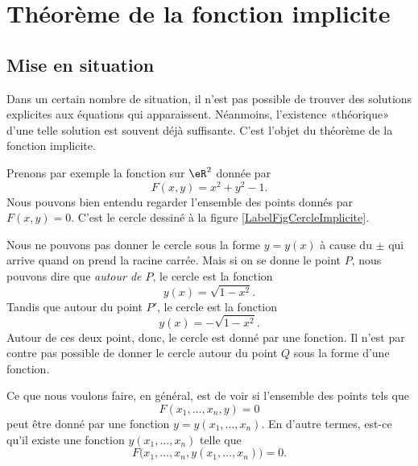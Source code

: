 					\section{Théorème de la fonction implicite}

\subsection{Mise en situation}

Dans un certain nombre de situation, il n'est pas possible de trouver des solutions explicites aux équations qui apparaissent. Néanmoins, l'existence «théorique» d'une telle solution est souvent déjà suffisante. C'est l'objet du théorème de la fonction implicite.

Prenons par exemple la fonction sur $\eR^2$ donnée par 
\begin{equation}
	F(x,y)=x^2+y^2-1.
\end{equation}
Nous pouvons bien entendu regarder l'ensemble des points donnés par $F(x,y)=0$. C'est le cercle dessiné à la figure \ref{LabelFigCercleImplicite}.
\newcommand{\CaptionFigCercleImplicite}{Un cercle pour montrer l'intérêt de la fonction implicite.}

Nous ne pouvons pas donner le cercle sous la forme $y=y(x)$ à cause du $\pm$ qui arrive quand on prend la racine carrée. Mais si on se donne le point $P$, nous pouvons dire que \emph{autour de $P$}, le cercle est la fonction
\begin{equation}
	y(x)=\sqrt{1-x^2}.
\end{equation}
Tandis que autour du point $P'$, le cercle est la fonction
\begin{equation}
	y(x)=-\sqrt{1-x^2}.
\end{equation}
Autour de ces deux point, donc, le cercle est donné par une fonction. Il n'est par contre pas possible de donner le cercle autour du point $Q$ sous la forme d'une fonction.

Ce que nous voulons faire, en général, est de voir si l'ensemble des points tels que
\begin{equation}
	F(x_1,\ldots,x_n,y)=0
\end{equation}
peut être donné par une fonction $y=y(x_1,\ldots,x_n)$. En d'autre termes, est-ce qu'il existe une fonction $y(x_1,\ldots,x_n)$ telle que
\begin{equation}
	F\big( x_1,\ldots,x_n,y(x_1,\ldots,x_n)\big)=0.
\end{equation}



